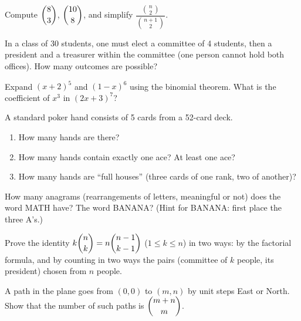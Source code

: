 \begin{exercise}[$\star$]\label{exo:tle:comb:2}
Compute $\dbinom{8}{3}$, $\dbinom{10}{8}$, and simplify
$\dfrac{\binom{n}{2}}{\binom{n+1}{2}}$.
\end{exercise}

\begin{exercise}[$\star$]\label{exo:tle:comb:3}
In a class of 30 students, one must elect a committee of 4 students, then a
president and a treasurer within the committee (one person cannot hold both
offices). How many outcomes are possible?
\end{exercise}

\begin{exercise}[$\star$]\label{exo:tle:comb:4}
Expand $(x + 2)^5$ and $(1 - x)^6$ using the binomial theorem. What is the
coefficient of $x^3$ in $(2x + 3)^7$?
\end{exercise}

\begin{exercise}[$\star\star$]\label{exo:tle:comb:5}
A standard poker hand consists of 5 cards from a 52-card deck.
\begin{enumerate}
  \item How many hands are there?
  \item How many hands contain exactly one ace? At least one ace?
  \item How many hands are ``full houses'' (three cards of one rank, two of
        another)?
\end{enumerate}
\end{exercise}

\begin{exercise}[$\star\star$]\label{exo:tle:comb:6}
How many anagrams (rearrangements of letters, meaningful or not) does the
word MATH have? The word BANANA?
(Hint for BANANA: first place the three A's.)
\end{exercise}

\begin{exercise}[$\star\star$]\label{exo:tle:comb:7}
Prove the identity $k\dbinom{n}{k} = n\dbinom{n-1}{k-1}$ ($1 \leq k \leq n$)
in two ways: by the factorial formula, and by counting in two ways the pairs
(committee of $k$ people, its president) chosen from $n$ people.
\end{exercise}

\begin{exercise}[$\star\star$]\label{exo:tle:comb:8}
A path in the plane goes from $(0,0)$ to $(m, n)$ by unit steps East or
North. Show that the number of such paths is $\dbinom{m+n}{m}$.
\end{exercise}

